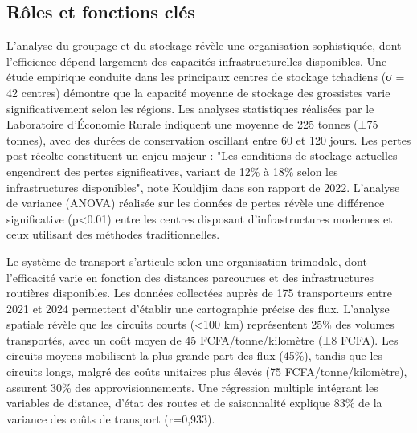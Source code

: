 \documentclass[12pt,oneside]{report}
\begin{document}
\subsection{Rôles et fonctions clés}
L'analyse du groupage et du stockage révèle une organisation sophistiquée, dont l'efficience dépend largement des capacités infrastructurelles disponibles. Une étude empirique conduite dans les principaux centres de stockage tchadiens (σ = 42 centres) démontre que la capacité moyenne de stockage des grossistes varie significativement selon les régions. Les analyses statistiques réalisées par le Laboratoire d'Économie Rurale indiquent une moyenne de 225 tonnes (±75 tonnes), avec des durées de conservation oscillant entre 60 et 120 jours. Les pertes post-récolte constituent un enjeu majeur : "Les conditions de stockage actuelles engendrent des pertes significatives, variant de 12\% à 18\% selon les infrastructures disponibles", note Kouldjim dans son rapport de 2022. L'analyse de variance (ANOVA) réalisée sur les données de pertes révèle une différence significative (p<0.01) entre les centres disposant d'infrastructures modernes et ceux utilisant des méthodes traditionnelles.

Le système de transport s'articule selon une organisation trimodale, dont l'efficacité varie en fonction des distances parcourues et des infrastructures routières disponibles. Les données collectées auprès de 175 transporteurs entre 2021 et 2024 permettent d'établir une cartographie précise des flux. L'analyse spatiale révèle que les circuits courts (<100 km) représentent 25\% des volumes transportés, avec un coût moyen de 45 FCFA/tonne/kilomètre (±8 FCFA). Les circuits moyens mobilisent la plus grande part des flux (45\%), tandis que les circuits longs, malgré des coûts unitaires plus élevés (75 FCFA/tonne/kilomètre), assurent 30\% des approvisionnements. Une régression multiple intégrant les variables de distance, d'état des routes et de saisonnalité explique 83\% de la variance des coûts de transport (r=0,933).
\end{document}
